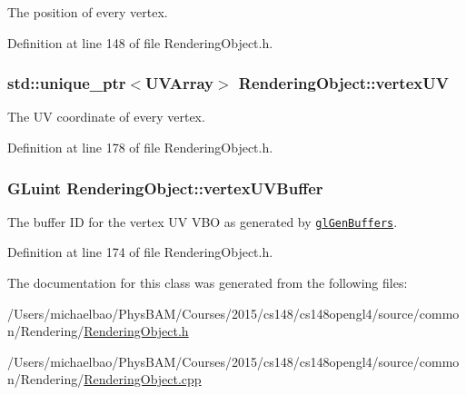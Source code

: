 The position of every vertex. 



Definition at line 148 of file Rendering\+Object.\+h.

\hypertarget{class_rendering_object_afc405316bddec4ba1d5c228ecc0d9061}{}
\subsubsection[{vertex\+U\+V}]{\setlength{\rightskip}{0pt plus 5cm}std\+::unique\+\_\+ptr$<${\bf U\+V\+Array}$>$ Rendering\+Object\+::vertex\+U\+V\hspace{0.3cm}{\ttfamily [protected]}}\label{class_rendering_object_afc405316bddec4ba1d5c228ecc0d9061}


The U\+V coordinate of every vertex. 



Definition at line 178 of file Rendering\+Object.\+h.

\hypertarget{class_rendering_object_ad583c70014e3f6ab0c9b62ea3c96ad25}{}
\subsubsection[{vertex\+U\+V\+Buffer}]{\setlength{\rightskip}{0pt plus 5cm}G\+Luint Rendering\+Object\+::vertex\+U\+V\+Buffer\hspace{0.3cm}{\ttfamily [protected]}}\label{class_rendering_object_ad583c70014e3f6ab0c9b62ea3c96ad25}


The buffer I\+D for the vertex U\+V V\+B\+O as generated by \href{https://www.opengl.org/sdk/docs/man/html/glGenBuffers.xhtml}{\tt gl\+Gen\+Buffers}. 



Definition at line 174 of file Rendering\+Object.\+h.



The documentation for this class was generated from the following files\+:\begin{DoxyCompactItemize}
\item 
/\+Users/michaelbao/\+Phys\+B\+A\+M/\+Courses/2015/cs148/cs148opengl4/source/common/\+Rendering/\hyperlink{_rendering_object_8h}{Rendering\+Object.\+h}\item 
/\+Users/michaelbao/\+Phys\+B\+A\+M/\+Courses/2015/cs148/cs148opengl4/source/common/\+Rendering/\hyperlink{_rendering_object_8cpp}{Rendering\+Object.\+cpp}\end{DoxyCompactItemize}
